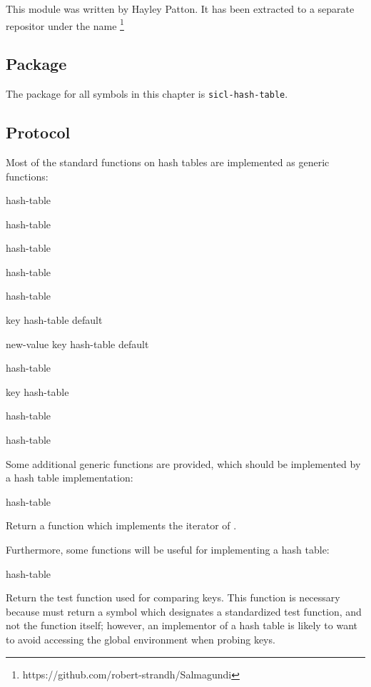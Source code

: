 This module was written by Hayley Patton.  It has been extracted to a
separate repositor under the name \salmagundi{}%
\footnote{https://github.com/robert-strandh/Salmagundi}

\subsection{Package}

The package for all symbols in this chapter is \texttt{sicl-hash-table}.

\subsection{Protocol}

Most of the standard functions on hash tables are implemented as
generic functions:

{\small{} {hash-table}
}

{\small{} {hash-table}
}

{\small{} {hash-table}
}

{\small{} {hash-table}
}

{\small{} {hash-table}
}

{\small{} {key hash-table \optional default}
}

{\small{} {new-value key hash-table \optional default}
}

{\small{} {hash-table}
}

{\small{} {key hash-table}
}

{\small{} {hash-table}
}

{\small{} {hash-table}
}

Some additional generic functions are provided, which should be implemented
by a hash table implementation:

 {hash-table}

Return a function which implements the iterator of
.

Furthermore, some functions will be useful for implementing a hash
table:

 {hash-table}

Return the test function used for comparing keys. This function is necessary
because  must return a symbol which designates a
standardized test function, and not the function itself; however, an
implementor of a hash table is likely to want to avoid accessing the global
environment when probing keys.

